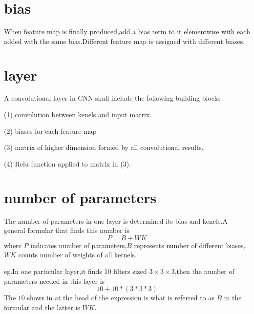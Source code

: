 \documentclass{article}
\begin{document}
\section{bias}
When feature map is finally produced,add a bias term to it elementwise with each added with the same bias.Different feature map is assigned with different biases.
\section{layer}
A convolutional layer in CNN shall include the following building blocks
\par (1) convolution between kenels and input matrix.
\par (2) biases for each feature map
\par (3) matrix of higher dimension formed by all convolutional results.
\par (4) Relu function applied to matrix in (3).
\section{number of parameters}
The number of parameters in one layer is determined its bias and kenels.A general formular that finds this number is
$$P=B+WK$$
where $P$ indicates number of parameters,$B$ represents number of different biases,$WK$ counts number of weights of all kernels.
\par eg.In one particular layer,it finds 10 filters sized $3\times3\times3$,then the number of parameters needed in this layer is$$10+10*(3*3*3)$$
The $10$ shows in at the head of the expression is what is referred to as $B$ in the formular and the latter is $WK$.
\end{document}
